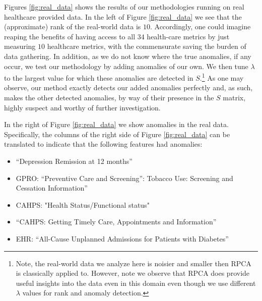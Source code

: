 \documentclass[conference]{IEEEtran}
\begin{document}
Figures \ref{fig:real_data} shows the results of our methodologies running on real healthcare provided data.  In the left of Figure \ref{fig:real_data} we see that the (approximate) rank of the real-world data is $10$.   Accordingly, one could imagine reaping the benefits of having access to all $34$ health-care metrics by just measuring $10$ healthcare metrics, with the commensurate saving the burden of data gathering.  In addition, as we do not know where the true anomalies, if any occur, we test our methodology by adding anomalies of our own.  We then tune $\lambda$ to the largest value for which these anomalies are detected in $S$.\footnote{Note, the real-world data we analyze here is noisier and smaller then RPCA is classically applied to.  However, note we observe that RPCA does provide useful insights into the data even in this domain even though we use different $\lambda$ values for rank and anomaly detection.} As one may observe, our method exactly detects  our added anomalies perfectly and, as such, makes the other detected anomalies, by way of their presence in the $S$ matrix, highly suspect and worthy of further investigation.   

In the right of Figure \ref {fig:real_data}
we show anomalies in the real data.  Specifically, the columns of the right side of Figure \ref {fig:real_data} can be translated to indicate that the following features had anomalies: 

\begin{itemize}
\item 
“Depression Remission at 12 months”

\item 
GPRO: “Preventive Care and Screening”: Tobacco Use: Screening and Cessation Information”  %

\item 
CAHPS: "Health Status/Functional status"
\item 
“CAHPS: Getting Timely Care, Appointments and Information”

\item 
EHR: “All-Cause Unplanned Admissions for Patients with Diabetes”
\end{itemize}
\end{document}
